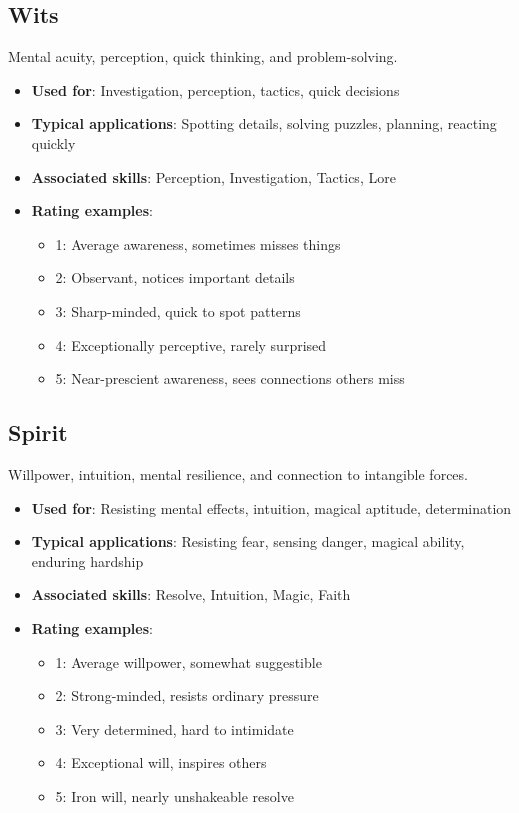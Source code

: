 \begin{multicols}{2}
\subsection*{Wits}

Mental acuity, perception, quick thinking, and problem-solving.
\begin{itemize}
\item \textbf{Used for}: Investigation, perception, tactics, quick decisions
\item \textbf{Typical applications}: Spotting details, solving puzzles, planning, reacting quickly
\item \textbf{Associated skills}: Perception, Investigation, Tactics, Lore
\item \textbf{Rating examples}:
  \begin{itemize}
    \item 1: Average awareness, sometimes misses things
    \item 2: Observant, notices important details
    \item 3: Sharp-minded, quick to spot patterns
    \item 4: Exceptionally perceptive, rarely surprised
    \item 5: Near-prescient awareness, sees connections others miss
  \end{itemize}
\end{itemize}

\subsection*{Spirit}

Willpower, intuition, mental resilience, and connection to intangible forces.
\begin{itemize}
\item \textbf{Used for}: Resisting mental effects, intuition, magical aptitude, determination
\item \textbf{Typical applications}: Resisting fear, sensing danger, magical ability, enduring hardship
\item \textbf{Associated skills}: Resolve, Intuition, Magic, Faith
\item \textbf{Rating examples}:
  \begin{itemize}
    \item 1: Average willpower, somewhat suggestible
    \item 2: Strong-minded, resists ordinary pressure
    \item 3: Very determined, hard to intimidate
    \item 4: Exceptional will, inspires others
    \item 5: Iron will, nearly unshakeable resolve
  \end{itemize}
\end{itemize}


\end{multicols}
